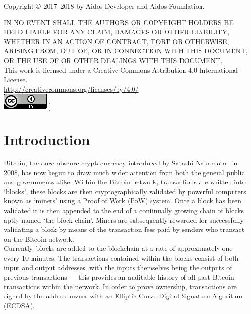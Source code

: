 \documentclass[a4paper,10pt,twocolumn]{article}
\begin{document}
			\vspace{1.5cm}
	
	\footnotesize
	Copyright \( \copyright \)  2017--2018 by Aidos Developer and Aidos Foundation.
	
	\vspace{2mm}
		
	IN NO EVENT SHALL THE AUTHORS OR COPYRIGHT HOLDERS BE HELD LIABLE FOR ANY CLAIM, DAMAGES OR OTHER
	LIABILITY, WHETHER IN AN ACTION OF CONTRACT, TORT OR OTHERWISE, ARISING FROM,
	OUT OF, OR IN CONNECTION WITH THIS DOCUMENT, OR THE USE OF OR OTHER DEALINGS WITH
	THIS DOCUMENT\@.\\
	
	This work is licensed under a Creative Commons Attribution 4.0 International License. \\
	\url{http://creativecommons.org/licenses/by/4.0/} \\
	\includegraphics{cc}
	]
	
	\normalsize
	\twocolumn[
	\tableofcontents
	\listoffigures
	]
	
	\clearpage
	
	\section{Introduction}
	Bitcoin, the once obscure cryptocurrency introduced by Satoshi Nakamoto~\cite{btc} in 2008, has now begun to draw much wider attention 
	from both the general public and governments alike. Within the Bitcoin network, transactions are written into `blocks', these blocks 
	are then cryptographically validated by powerful computers known as `miners' using a Proof of Work (PoW) system. Once a block has been 
	validated it is then appended to the end of a continually growing chain of blocks aptly named `the block-chain'. Miners are 
	subsequently rewarded for successfully validating a block by means of the transaction fees paid by senders who transact on the Bitcoin 
	network.\\
	
	Currently, blocks are added to the blockchain at a rate of approximately one every 10 minutes. The transactions contained within the
	blocks consist of both input and output addresses, with the inputs themselves being the outputs of previous transactions --- this 
	provides an auditable history of all past Bitcoin transactions within the network. In order to prove ownership, transactions are signed 
	by the address owner with an Elliptic Curve Digital Signature Algorithm (ECDSA).\\
	
\end{document}
